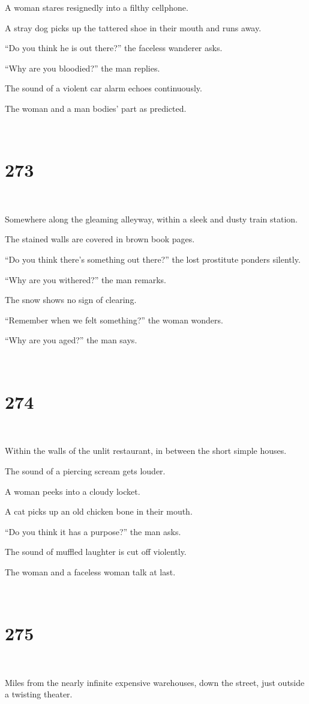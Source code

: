 \documentclass{report}
\begin{document}
A woman stares resignedly into a filthy cellphone.

A stray dog picks up the tattered shoe in their mouth and runs away.

``Do you think he is out there?'' the faceless wanderer asks.

``Why are you bloodied?'' the man replies.

The sound of a violent car alarm echoes continuously.

The woman and a man bodies' part as predicted.

~
\chapter*{273}
~

Somewhere along the gleaming alleyway, within a sleek and dusty train station.

The stained walls are covered in brown book pages.

``Do you think there's something out there?'' the lost prostitute ponders silently.

``Why are you withered?'' the man remarks.

The snow shows no sign of clearing.

``Remember when we felt something?'' the woman wonders.

``Why are you aged?'' the man says.

~
\chapter*{274}
~

Within the walls of the unlit restaurant, in between the short simple houses.

The sound of a piercing scream gets louder.

A woman peeks into a cloudy locket.

A cat picks up an old chicken bone in their mouth.

``Do you think it has a purpose?'' the man asks.

The sound of muffled laughter is cut off violently.

The woman and a faceless woman talk at last.

~
\chapter*{275}
~

Miles from the nearly infinite expensive warehouses, down the street, just outside a twisting theater.
\end{document}
